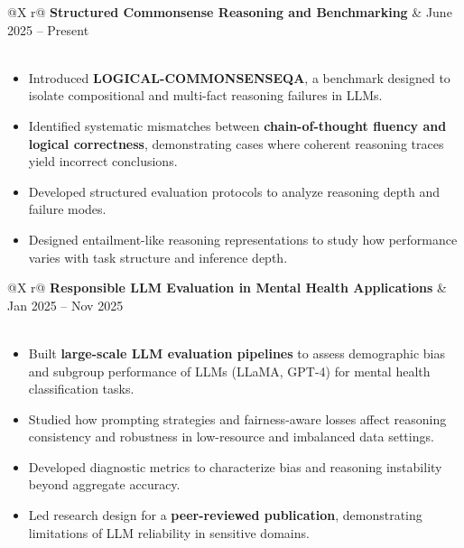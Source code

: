 \documentclass[a4paper,11pt]{article}
\begin{document}
\begin{tabularx}{\linewidth}{@{}X r@{}}
\textbf{Structured Commonsense Reasoning and Benchmarking} & June 2025 – Present \\
 \\
\end{tabularx}
\begin{itemize}[nosep, after=\strut, leftmargin=1.5em, itemsep=2pt]
    \item Introduced \textbf{LOGICAL-COMMONSENSEQA}, a benchmark designed to isolate compositional and multi-fact reasoning failures in LLMs.
    \item Identified systematic mismatches between \textbf{chain-of-thought fluency and logical correctness}, demonstrating cases where coherent reasoning traces yield incorrect conclusions.
    \item Developed structured evaluation protocols to analyze reasoning depth and failure modes.
    \item Designed entailment-like reasoning representations to study how performance varies with task structure and inference depth.
\end{itemize}


\begin{tabularx}{\linewidth}{@{}X r@{}}
\textbf{Responsible LLM Evaluation in Mental Health Applications} & Jan 2025 – Nov 2025 \\
 \\
\end{tabularx}
\begin{itemize}[nosep, after=\strut, leftmargin=1.5em, itemsep=2pt]
    \item Built \textbf{large-scale LLM evaluation pipelines} to assess demographic bias and subgroup performance of LLMs (LLaMA, GPT-4) for mental health classification tasks.
    \item Studied how prompting strategies and fairness-aware losses affect reasoning consistency and robustness in low-resource and imbalanced data settings.
    \item Developed diagnostic metrics to characterize bias and reasoning instability beyond aggregate accuracy.
    \item Led research design for a \textbf{peer-reviewed publication}, demonstrating limitations of LLM reliability in sensitive domains.
\end{itemize}
\end{document}
